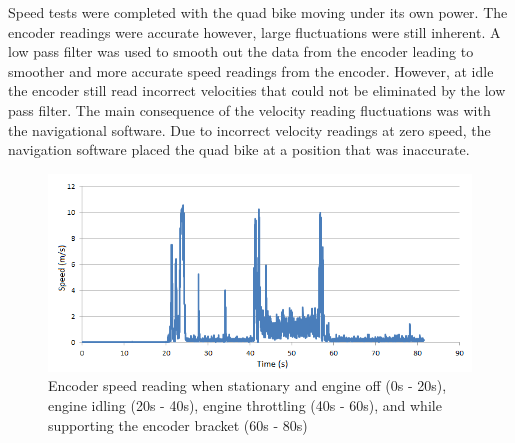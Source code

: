 \documentclass[main.tex]{subfiles}
\begin{document}
Speed tests were completed with the quad bike moving under its own power. The encoder readings were accurate however, large fluctuations were still inherent. A low pass filter was used to smooth out the data from the encoder leading to smoother and more accurate speed readings from the encoder. However, at idle the encoder still read incorrect velocities that could not be eliminated by the low pass filter. The main consequence of the velocity reading fluctuations was with the navigational software. Due to incorrect velocity readings at zero speed, the navigation software placed the quad bike at a position that was inaccurate.

\begin{figure}[ht]
\includegraphics[width=1\textwidth]{5-Testing/Encoder_data_with_engine_running.png}
\centering
\caption[Encoder speed reading for various engine states]{Encoder speed reading when stationary and engine off (0s - 20s), engine idling (20s - 40s), engine throttling (40s - 60s), and while supporting the encoder bracket (60s - 80s)}
\end{figure}
\end{document}

